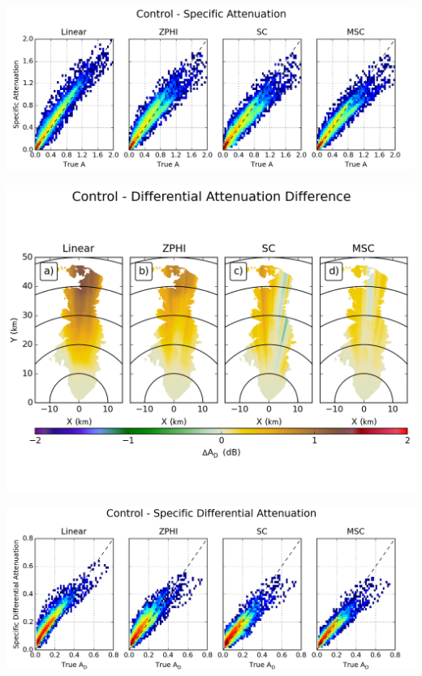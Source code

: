 \documentclass[red]{beamer}
\begin{document}
\begin{frame}
	\begin{center}
		\includegraphics[scale=0.45]{figures/C_Control_Specific_Attenuation_scatter.png}
	\end{center}
\end{frame}

\begin{frame}
	\begin{center}
		\includegraphics[scale=0.45]{figures/C_Control_Differential_Attenuation_Difference.png}
	\end{center}
\end{frame}

\begin{frame}
	\begin{center}
		\includegraphics[scale=0.45]{figures/C_Control_Specific_Differential_Attenuation_scatter.png}
	\end{center}
\end{frame}
\end{document}
